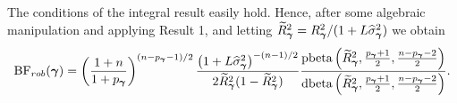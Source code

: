 \noindent The conditions of the integral result easily hold.
%
%
%
%
%
%
Hence, after some algebraic manipulation and applying Result 1, and letting
$\widetilde{R}_{\boldsymbol \gamma}^2 = R_{\boldsymbol \gamma}^2/(1 + L\widehat{\sigma}_{\boldsymbol \gamma}^2)$ we obtain
\begin{equation}\label{eq:yGivenGammaRobust2}
	\displaystyle \mbox{BF}_{{rob}}({\boldsymbol \gamma})
	= \left( \frac{1 + n}{1 + p_{\boldsymbol \gamma}} \right)^{(n - p_{\boldsymbol \gamma} - 1)/2} \frac{\left( 1 + L\widehat{\sigma}_{\boldsymbol \gamma}^2 \right)^{-(n - 1)/2}}{2 \widetilde{R}_{\boldsymbol \gamma}^2(1 - \widetilde{R}_{\boldsymbol \gamma}^2)} 
	\frac{
		\mbox{pbeta}\left( 
		\widetilde{R}_{\boldsymbol \gamma}^2,
		\frac{p_{\boldsymbol \gamma} +1}{2},
		\frac{n - p_{\boldsymbol \gamma} - 2}{2} 
		\right)
	}{
		\mbox{dbeta}\left( 
		\widetilde{R}_{\boldsymbol \gamma}^2,
		\frac{p_{\boldsymbol \gamma} +1}{2},
		\frac{n - p_{\boldsymbol \gamma} - 2}{2} 
		\right)
	}.
\end{equation}


